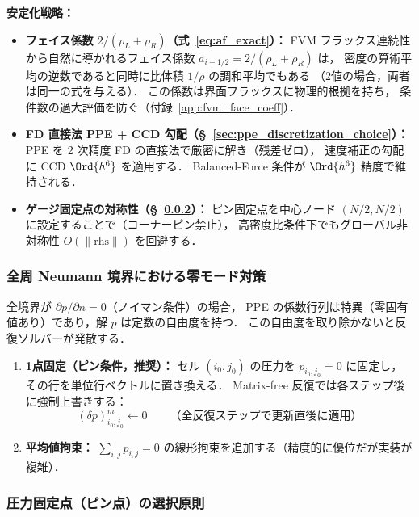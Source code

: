 \noindent\textbf{安定化戦略：}
\begin{itemize}
  \item \textbf{フェイス係数 $2/(\rho_L+\rho_R)$（式~\eqref{eq:af_exact}）：}
        FVM フラックス連続性から自然に導かれるフェイス係数 $a_{i+1/2} = 2/(\rho_L+\rho_R)$ は，
        密度の算術平均の逆数であると同時に比体積 $1/\rho$ の調和平均でもある
        （2値の場合，両者は同一の式を与える）．
        この係数は界面フラックスに物理的根拠を持ち，
        条件数の過大評価を防ぐ（付録~\ref{app:fvm_face_coeff}）．
  \item \textbf{FD 直接法 PPE + CCD 勾配（§~\ref{sec:ppe_discretization_choice}）：}
        PPE を 2 次精度 FD の直接法で厳密に解き（残差ゼロ），
        速度補正の勾配に CCD $\Ord{h^6}$ を適用する．
        Balanced-Force 条件が $\Ord{h^6}$ 精度で維持される．
  \item \textbf{ゲージ固定点の対称性（§~\ref{sec:pinpoint}）：}
        ピン固定点を中心ノード $(N/2, N/2)$ に設定することで（コーナーピン禁止），
        高密度比条件下でもグローバル非対称性 $O(\|\mathrm{rhs}\|)$ を回避する．

\end{itemize}

\subsubsection{全周 Neumann 境界における零モード対策}
\label{sec:ppe_zero_mode}

全境界が $\partial p/\partial n = 0$（ノイマン条件）の場合，
PPE の係数行列は特異（零固有値あり）であり，解 $p$ は定数の自由度を持つ．
この自由度を取り除かないと反復ソルバーが発散する．

\begin{enumerate}
  \item \textbf{1点固定（ピン条件，推奨）：}
        セル $(i_0, j_0)$ の圧力を $p_{i_0,j_0} = 0$ に固定し，その行を単位行ベクトルに置き換える．
        Matrix-free 反復では各ステップ後に強制上書きする：
        \begin{equation}
          (\delta p)^m_{i_0, j_0} \leftarrow 0
          \qquad \text{（全反復ステップで更新直後に適用）}
          \label{eq:pin_overwrite}
        \end{equation}
  \item \textbf{平均値拘束：} $\sum_{i,j} p_{i,j} = 0$ の線形拘束を追加する（精度的に優位だが実装が複雑）．
\end{enumerate}

\subsubsection{圧力固定点（ピン点）の選択原則}
\label{sec:pinpoint}

